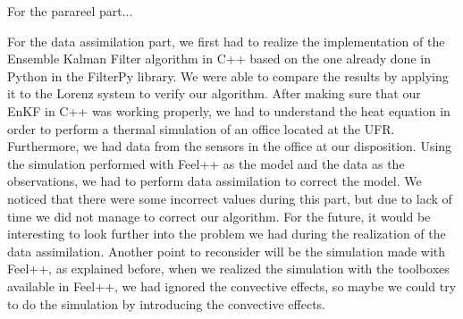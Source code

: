 \documentclass[12pt]{article}
\begin{document}
	\noindent For the parareel part...
	
	\noindent For the data assimilation part, we first had to realize the implementation of the Ensemble Kalman Filter algorithm in C++ based on the one already done in Python in the FilterPy library. We were able to compare the results by applying it to the Lorenz system to verify our algorithm. After making sure that our EnKF in C++ was working properly, we had to understand the heat equation in order to perform a thermal simulation of an office located at the UFR. Furthermore, we had data from the sensors in the office at our disposition. Using the simulation performed with Feel++ as the model and the data as the observations, we had to perform data assimilation to correct the model. We noticed that there were some incorrect values during this part, but due to lack of time we did not manage to correct our algorithm. For the future, it would be interesting to look further into the problem we had during the realization of the data assimilation. Another point to reconsider will be the simulation made with Feel++, as explained before, when we realized the simulation with the toolboxes available in Feel++, we had ignored the convective effects, so maybe we could try to do the simulation by introducing the convective effects. 
	
	
	\newpage
	
	\appendix
	
		
	
	\newpage	
	\printbibliography[title={References}]
\end{document}
